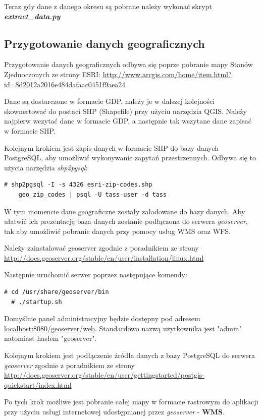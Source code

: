 \documentclass[10pt,a4paper]{article}
\begin{document}
\bigskip \noindent
Teraz gdy dane z danego okresu są pobrane należy wykonać skrypt \textit{\textbf{extract\_data.py}}

\subsection{Przygotowanie danych geograficznych}
\bigskip \noindent
Przygotowanie danych geograficznych odbywa się poprze pobranie mapy Stanów Zjednoczonych ze strony ESRI:
\url{http://www.arcgis.com/home/item.html?id=8d2012a2016e484dafaac0451f9aea24}

Dane są dostarczone w formacie GDP, należy je w dalszej kolejności skownertować do postaci SHP (Shapefile) przy użyciu narzędzia QGIS. Należy najpierw wczytać dane w formacie GDP, a następnie tak wczytane dane zapisać w formacie SHP.

Kolejnym krokiem jest zapis danych w formacie SHP do bazy danych PostgreSQL, aby umożliwić wykonywanie zapytań przestrzennych. Odbywa się to użycia narzędzia \textit{shp2pgsql}:
\bigskip \noindent
\begin{lstlisting}[style=BashInputStyle]
  # shp2pgsql -I -s 4326 esri-zip-codes.shp
  	geo_zip_codes | psql -U tass-user -d tass
\end{lstlisting}

W tym momencie dane geograficzne zostały załadowane do bazy danych. Aby ułatwić ich prezentację baza danych zostanie podłączona do serwera \textit{geoserver}, tak aby umożliwić pobranie danych przy pomocy usług WMS oraz WFS. 

Należy zainstalować geoserver zgodnie z poradnikiem ze strony \url{http://docs.geoserver.org/stable/en/user/installation/linux.html} 

Następnie uruchomić serwer poprzez następujące komendy:
\begin{lstlisting}[style=BashInputStyle]
  # cd /usr/share/geoserver/bin
  # ./startup.sh
\end{lstlisting}

Domyślnie panel administracyjny będzie dostępny pod adresem \url{localhost:8080/geoserver/web}. Standardowo nazwą użytkownika jest "admin" natomiast hasłem "geoserver".

Kolejnym krokiem jest podłączenie źródła danych z bazy PostgreSQL do serwera \textit{geoserver} zgodnie z poradnikiem ze strony \url{http://docs.geoserver.org/stable/en/user/gettingstarted/postgis-quickstart/index.html} 

Po tych krok możliwe jest pobranie całej mapy w formacie rastrowym do aplikacji przy użyciu usługi internetowej udostępnianej przez \textit{geoserver} - \textbf{WMS}.
\end{document}
